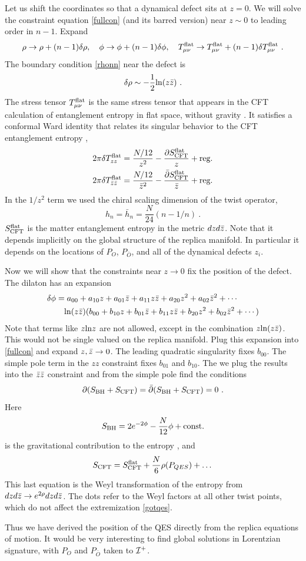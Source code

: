 \documentclass[11pt,oneside,letterpaper]{article}
\newcommand{\p}{\partial}
\newcommand{\be}{\begin{equation}}
\newcommand{\ee}{\end{equation}}
\def\be{\begin{eqnarray}}
\def\ee{\end{eqnarray}}
\def\be{\begin{equation}}
\def\ee{\end{equation}}
\def\log{{\rm ln}}
\renewcommand{\p}{\partial}
\numberwithin{equation}{section}
\def \be {\begin{equation}}
\def \ee {\end{equation}}
\begin{document}
Let us shift the coordinates so that a dynamical defect sits at $z=0$. We will solve the constraint equation \eqref{fullcon} (and its barred version) near $z\sim 0$ to leading order in $n-1$. Expand
\be
\rho \to \rho + (n-1)\delta \rho , \quad
\phi \to \phi + (n-1)\delta \phi , \quad
T_{\mu\nu}^{\rm flat} \to T_{\mu\nu}^{\rm flat} + (n-1)\delta T_{\mu\nu}^{\rm flat} \ .
\ee
The boundary condition \eqref{rhonn} near the defect is
\be\label{rhobc}
\delta \rho \sim -\frac{1}{2}\log (z\bz ) \ .
\ee
The stress tensor $T^{\rm flat}_{\mu\nu}$ is the same stress tensor that appears in the CFT calculation of entanglement entropy in flat space, without gravity \cite{Holzhey:1994we,Calabrese:2004eu}. It satisfies a conformal Ward identity that relates its singular behavior to the CFT entanglement entropy \cite{Calabrese:2004eu},
\begin{align}
2\pi \delta T_{zz}^{\rm flat} &= \frac{N/12}{z^2} - \frac{\p S_{\rm CFT}^{\rm flat}}{z} + \mbox{reg.} \\
2\pi \delta T_{\bz \bz}^{\rm flat} &= \frac{N/12}{\bz^2} - \frac{ \bar{\p} S_{\rm CFT}^{\rm flat}}{\bz} + \mbox{reg.}
\end{align}
In the $1/z^2$ term we used the chiral scaling dimension of the twist operator,
\be
h_n = \bar{h}_n = \frac{N}{24}(n-1/n) \ .
\ee
$S_{\rm CFT}^{\rm flat}$ is the matter entanglement entropy in the metric $dz d\bar{z}$.  Note that it depends implicitly on the global structure of the replica manifold. In particular it depends on the locations of $P_O$, $P_{\bar{O}}$, and all of the  dynamical defects $z_i$.

Now we will show that the constraints near $z \to 0$ fix the position of the defect. The dilaton has an expansion
\begin{align}
\delta \phi &= a_{00} + a_{10}z + a_{01} \bz + a_{11}z \bz + a_{20} z^2 + a_{02} \bz^2 +  \cdots\\
&\quad \log(z\bz)(b_{00} + b_{10}z + b_{01} \bz + b_{11}z \bz + b_{20} z^2 + b_{02} \bz^2 +  \cdots) \notag
\end{align}
Note that terms like $z \log z$ are not allowed, except in the combination $z \log (z \bz)$. This would not be single valued on the replica manifold. Plug this expansion into \eqref{fullcon} and expand $z,\bar{z} \to 0$. The leading quadratic singularity fixes $b_{00}$. The simple pole term in the $zz$ constraint fixes $b_{01}$ and $b_{10}$. The we plug the results into the $\bar{z} \bar{z}$ constraint and from the simple pole find the conditions
\be\label{gotqes}
\p( S_{\rm BH} + S_{\rm CFT} ) = \bar{\p} (S_{\rm BH} + S_{\rm CFT}) = 0 \ .
\ee
Here
\be
S_{\rm BH} = 2e^{-2\phi} - \frac{N}{12} \phi + \mbox{const}. 
\ee
is the gravitational contribution to the entropy \cite{Fiola:1994ir,Myers:1994sg}, 
and
\be
S_{\rm CFT} = S_{\rm CFT}^{\rm flat} + \frac{N}{6}\rho(P_{QES}) + \dots \,
\ee
This last equation is the Weyl transformation of the entropy from $dz d\bar{z} \to e^{2\rho} dz d\bar{z}$. The dots refer to the Weyl factors at all other twist points, which do not affect the extremization \eqref{gotqes}. 

Thus we have derived the position of the QES directly from the replica equations of motion. It would be very interesting to find global solutions in Lorentzian signature, with $P_O$ and $P_{\bar{O}}$ taken to ${\cal I}^+$. 




\small

 
\end{document}
